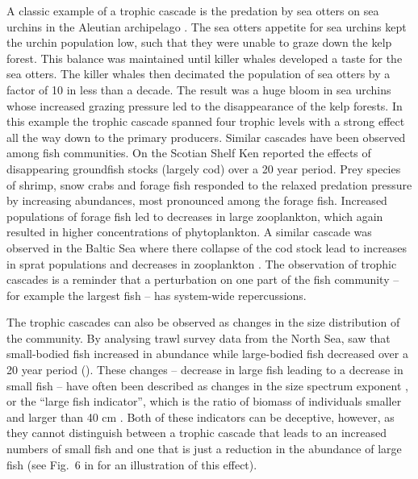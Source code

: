 A classic example of a trophic cascade is the predation by sea otters on sea urchins in the Aleutian archipelago \citep{Estes1998}.  The sea otters appetite for sea urchins kept the urchin population low, such that they were unable to graze down the kelp forest.  This balance was maintained until killer whales developed a taste for the sea otters.  The killer whales then decimated the population of sea otters by a factor of 10 in less than a decade.  The result was a huge bloom in sea urchins whose increased grazing pressure led to the disappearance of the kelp forests.  In this example the trophic cascade spanned four trophic levels with a strong effect all the way down to the primary producers.  Similar cascades have been observed among fish communities.  On the Scotian Shelf Ken \citet{Frank2005} reported the effects of disappearing groundfish stocks (largely cod) over a 20 year period.  Prey species of shrimp, snow crabs and forage fish responded to the relaxed predation pressure by increasing abundances, most pronounced among the forage fish.  Increased populations of forage fish led to decreases in large zooplankton, which again resulted in higher concentrations of phytoplankton.  A similar cascade was observed in the Baltic Sea where there collapse of the cod stock lead to increases in sprat populations and decreases in zooplankton \citep{Casini2008}.  The observation of trophic cascades is a reminder that a perturbation on one part of the fish community -- for example the largest fish -- has system-wide repercussions. 

The trophic cascades can also be observed as changes in the size distribution of the community.  By analysing trawl survey data from the North Sea, \citet{Daan2005} saw that small-bodied fish increased in abundance while large-bodied fish decreased over a 20 year period ().   These changes -- decrease in large fish leading to a decrease in small fish -- have often been described as changes in the size spectrum exponent \citep{Rice1996, Bianchi2000, Daan2005}, or the ``large fish indicator'', which is the ratio of biomass of individuals smaller and larger than 40 cm \citep{Greenstreet2010, Blanchard2014}.  Both of these indicators can be deceptive, however, as they cannot distinguish between a trophic cascade that leads to an increased numbers of small fish and one that is just a reduction in the abundance of large fish (see Fig.~6 in \citet{Andersen2010} for an illustration of this effect). 

